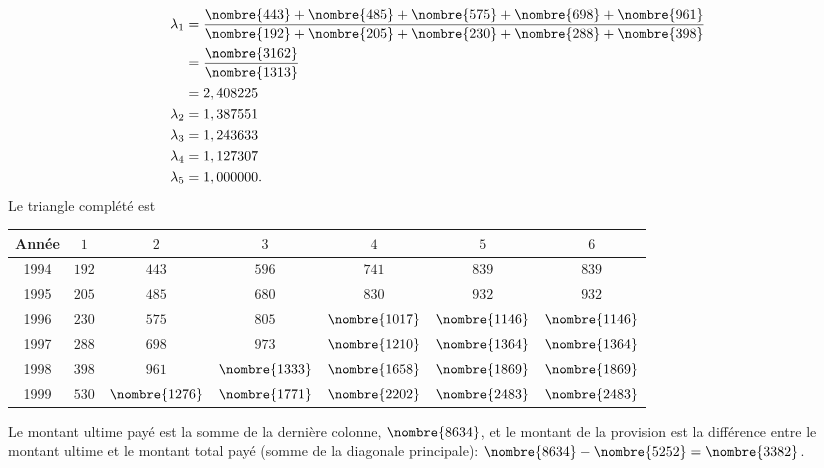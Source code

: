 \begin{exercice}
\begin{sol}
\begin{align*}
      \lambda_1 &= \frac{\nombre{443} + \nombre{485} + \nombre{575}
                  +\nombre{698} + \nombre{961}}{\nombre{192} +
                  \nombre{205} + \nombre{230} + \nombre{288} + \nombre{398}}\\
                &=  \frac{\nombre{3162}}{\nombre{1313}}\\
                &= 2,408225\\
      \lambda_2 &=  1,387551\\
      \lambda_3 &= 1,243633\\
      \lambda_4 &=  1,127307\\
      \lambda_5 &= 1,000000.
    \end{align*}
    Le triangle complété est
    \begin{center}
      \begin{tabular}{|c|c c c c c c|}\hline
        Année & $1$ & $2$ & $3$ & $4$ & $5$ & $6$ \\ \hline
        1994 & $192$ & $443$ & $596$ & $741$ & $839$  & $839$ \\
        1995 & $205$ & $485$ & $680$ & $830$ & $932$ & $932$  \\
        1996 & $230$ & $575$ & $805$ & $\nombre{1017}$ & $\nombre{1146}$    & $\nombre{1146}$  \\
        1997 & $288$ & $698$ & $973$ &  $\nombre{1210}$   &   $\nombre{1364}$  & $\nombre{1364}$  \\
        1998 & $398$ & $961$ &  $\nombre{1333}$   &  $\nombre{1658}$   & $\nombre{1869}$    & $\nombre{1869}$  \\
        1999 & $530$ &  $\nombre{1276}$   &  $\nombre{1771}$   &   $\nombre{2202}$  &  $\nombre{2483}$   &  $\nombre{2483}$ \\ \hline
      \end{tabular}
    \end{center}
    Le montant ultime payé est la somme de la dernière colonne,
    $\nombre{8634}$, et le montant de la provision est la différence
    entre le montant ultime et le montant total payé (somme de la
    diagonale principale):
    $\nombre{8634} - \nombre{5252} = \nombre{3382}$.
  \end{sol}
\end{exercice}

